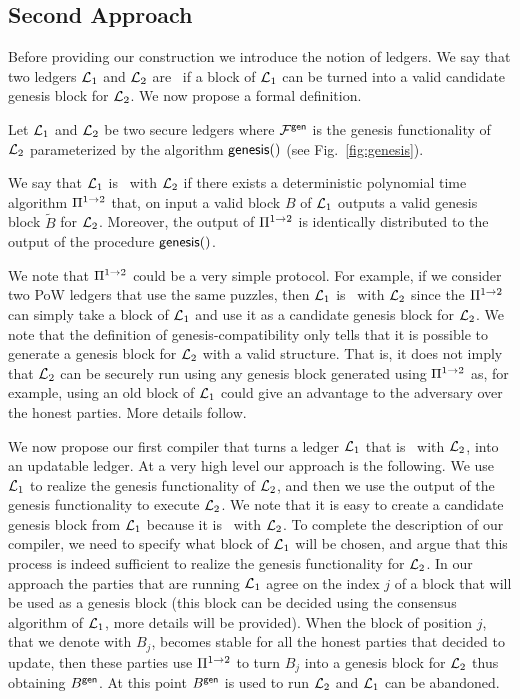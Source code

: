 \subsection{Second Approach}\label{se:first}
Before providing our construction we introduce the notion of \emph{\gencompatible} ledgers. We say that
two ledgers $\mathcal{L}_1$ and $\mathcal{L}_2$ are \gencompatible\ if a block of 
$\mathcal{L}_1$ can be turned into a valid candidate genesis block for $\mathcal{L}_2$. We now propose a formal definition.


\begin{definition}
Let $\mathcal{L}_1$ and $\mathcal{L}_2$ be two secure ledgers where $\mathcal{F}^\mathsf{gen}$ is the genesis functionality 
of $\mathcal{L}_2$ parameterized by the algorithm $\mathsf{genesis}()$ (see Fig.~\ref{fig:genesis}).

We say that $\mathcal{L}_1$ is \gencompatible\ with $\mathcal{L}_2$ if there exists a deterministic polynomial time
algorithm $\Pi^{1\rightarrow 2}$ that, on input a valid block $B$ of $\mathcal{L}_1$ 
outputs a valid genesis block $\tilde B$ for $\mathcal{L}_2$. Moreover, the output of $\Pi^{1\rightarrow 2}$ is identically distributed to the output of the procedure $\mathsf{genesis}()$.
\end{definition} 



We note that $\Pi^{1\rightarrow 2}$ could be a very simple protocol. For example, if we consider two PoW ledgers 
that use the same puzzles, then $\mathcal{L}_1$ is 
\gencompatible\ with $\mathcal{L}_2$ since the $\Pi^{1\rightarrow 2}$ can simply take a block of $\mathcal{L}_1$ and use it as
a candidate genesis block for $\mathcal{L}_2$.
We note that the definition of genesis-compatibility only tells that it is possible to generate a genesis block for $\mathcal{L}_2$ with a valid structure. That is, it does not imply that $\mathcal{L}_2$ can be securely run using any genesis block generated using $\Pi^{1\rightarrow 2}$ as, for example, using an old block of $\mathcal{L}_1$ could give an advantage to the adversary over the honest parties.  More details follow.

We now propose our first compiler that turns a ledger $\mathcal{L}_1$ that is \gencompatible\ with $\mathcal{L}_2$,
into an updatable ledger.
At a very high level our approach is the following. We use $\mathcal{L}_1$ to realize the genesis functionality 
of $\mathcal{L}_2$, and then we use the output of the genesis functionality to execute $\mathcal{L}_2$.
We note that it is easy to create a candidate genesis block from $\mathcal{L}_1$ because it is \gencompatible\
with $\mathcal{L}_2$.
To complete the description of our compiler, we need to specify what block of $\mathcal{L}_1$ will be chosen, and
argue that this process is indeed sufficient to realize the genesis functionality for $\mathcal{L}_2$.
In our approach the parties that are running $\mathcal{L}_1$ agree on the index $j$ of a block that will be used
as a genesis block (this block can be decided using the consensus algorithm of $\mathcal{L}_1$, more details will be provided). 
When the block of position $j$, that we denote with $B_j$, becomes stable for all the honest parties that decided to update, then these parties use $\Pi^{1\rightarrow 2}$ to turn $B_j$ into a genesis block for $\mathcal{L}_2$ thus obtaining
$B^\mathsf{gen}$. At this point $B^\mathsf{gen}$ is used to run $\mathcal{L}_2$ and $\mathcal{L}_1$ can be abandoned.

